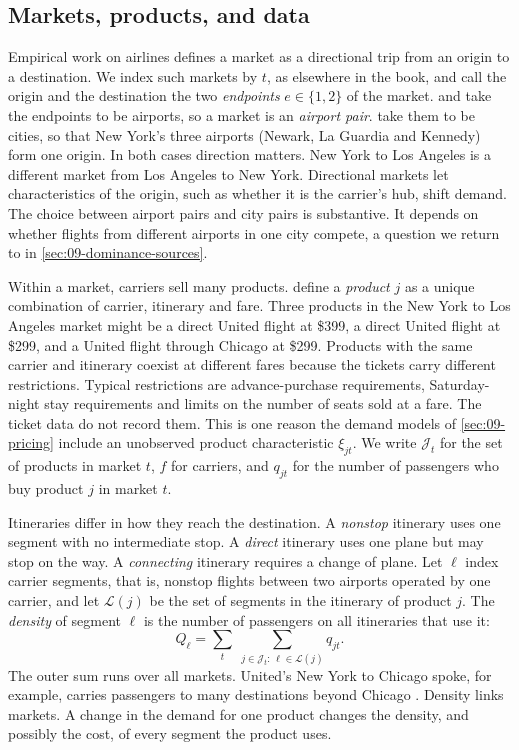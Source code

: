 \subsection{Markets, products, and data}\label{sec:09-data}

Empirical work on airlines defines a market as a directional trip from an origin to a destination. We index
such markets by $t$, as elsewhere in the book, and call the origin and the destination the two
\emph{endpoints} $e \in \{1,2\}$ of the market. \citet[p.~362]{Borenstein1989} and \citet{WhinstonCollins1992}
take the endpoints to be airports, so a market is an \emph{airport pair}. \citet[p.~7]{BerryCarnallSpiller2006}
take them to be cities, so that New York's three airports (Newark, La Guardia and Kennedy) form one origin.
In both cases direction matters. New York to Los Angeles is a different market from Los Angeles to New York.
Directional markets let characteristics of the origin, such as whether it is the carrier's hub, shift demand.
The choice between airport pairs and city pairs is substantive. It depends on whether flights from different
airports in one city compete, a question we return to in \cref{sec:09-dominance-sources}.

Within a market, carriers sell many products. \citet[p.~7]{BerryCarnallSpiller2006} define a \emph{product}
$j$ as a unique combination of carrier, itinerary and fare. Three products in the New York to Los Angeles
market might be a direct United flight at \$399, a direct United flight at \$299, and a United flight through
Chicago at \$299. Products with the same carrier and itinerary coexist at different fares because the tickets
carry different restrictions. Typical restrictions are advance-purchase requirements, Saturday-night stay
requirements and limits on the number of seats sold at a fare. The ticket data do not record them. This is one
reason the demand models of \cref{sec:09-pricing} include an unobserved product characteristic $\xi_{jt}$. We
write $\mathcal{J}_t$ for the set of products in market $t$, $f$ for carriers, and $q_{jt}$ for the number of
passengers who buy product $j$ in market $t$.

Itineraries differ in how they reach the destination. A \emph{nonstop} itinerary uses one segment with no
intermediate stop. A \emph{direct} itinerary uses one plane but may stop on the way. A \emph{connecting}
itinerary requires a change of plane. Let $\ell$ index carrier segments, that is, nonstop flights between two
airports operated by one carrier, and let $\mathcal{L}(j)$ be the set of segments in the itinerary of product
$j$. The \emph{density} of segment $\ell$ is the number of passengers on all itineraries that use it:
\begin{equation}\label{eq:09-density}
  Q_\ell = \sum_{t} \; \sum_{j \in \mathcal{J}_t :\, \ell \in \mathcal{L}(j)} q_{jt}.
\end{equation}
The outer sum runs over all markets. United's New York to Chicago spoke, for example, carries passengers to
many destinations beyond Chicago \citep[p.~8]{BerryCarnallSpiller2006}. Density links markets. A change in
the demand for one product changes the density, and possibly the cost, of every segment the product uses.

